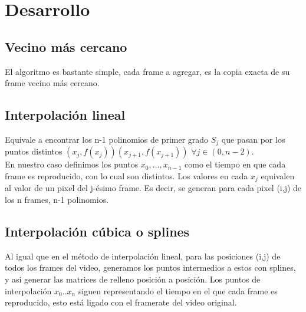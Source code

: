 \section{Desarrollo}

\subsection{Vecino más cercano}
El algoritmo es bastante simple, cada frame a agregar, es la copia exacta de su frame vecino más cercano.\\

\subsection{Interpolación lineal}
Equivale a encontrar los n-1 polinomios de primer grado $S_{j}$ que pasan por los puntos distintos $(x_{j},f(x_{j}))(x_{j+1},f(x_{j+1}))$ $\forall j \in (0,n-2)$.\\
En nuestro caso definimos los puntos $x_{0}, ... , x_{n-1}$ como el tiempo en que cada frame es reproducido, con lo cual son distintos. Los valores en cada $x_{j}$ equivalen al valor de un pixel del j-ésimo frame. Es decir, se generan para cada pixel (i,j) de los n frames, n-1 polinomios.\\


\subsection{Interpolación cúbica o splines}

Al igual que en el método de interpolación lineal, para las posiciones (i,j) de todos los frames del video, generamos los puntos intermedios a estos con splines, y asi generar las matrices de relleno posición a posición. Los puntos de interpolación $x_{0} .. x_{n}$ siguen representando el tiempo en el que cada frame es reproducido, esto está ligado con el framerate del video original.\\

